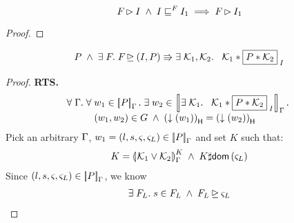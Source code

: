%
%
\begin{lemma}[]
%
\[
		\fence{} \fences I \;\land\; I \weakenI{\fence{}} I_1 \implies \fence{} \fences I_1
\]
%
\begin{proof}
\todo
\end{proof}
\end{lemma}
%
%

\begin{lemma}[] \label{lem:extension}
%
\[
		P \;\land\; \exsts{\fence{}} \fence{} \strictfences (I, P)  \Rrightarrow \exsts{\capAss{1}, \capAss{2}} \;\; \capAss{1} * \shared{P * \capAss{2}}{I}
\]
%
\begin{proof}
\textbf{RTS. }
%
\[
\begin{array}{l}
	\for{\lenv} \for{w_1 \in \sem[\lenv]{P}} \exsts{w_2 \in \sem[\lenv]{\exsts{\capAss{1}} \;\; \capAss{1} * \shared{P * \capAss{2}}{I}}}\\
	\hspace*{1cm} (w_1, w_2) \in \guarantee \;\land\; \heapPart{\left(\collapseW{w_1}\right)} = \heapPart{\left(\collapseW{w_2}\right)}
\end{array}
\]
%
Pick an arbitrary $\lenv$, $w_1 = (l, s, \amod{}, \amod{L}) \in \sem[\lenv]{P}$ and set $K$ such that:
\begin{align}
	K = 
	\semK[\lenv]{\capAss{1} \lor \capAss{2}}
	\;\land\; K \disjoint \dom{\amod{L}} \label{LE:Ass1}
\end{align}	 
%
Since $(l, s, \amod{}, \amod{L}) \in \sem[\lenv]{P}$, we know 
\begin{align}
	\exsts{\fence{L}} s \in \fence{L} \;\land\; \fence{L} \strictfences \amod{L} \label{LE:Ass2}
\end{align} 

\end{proof}
\end{lemma}
